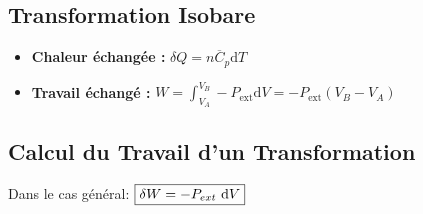 \documentclass[a4paper,12pt]{article}
\newcommand{\diff}{\mathrm{d}} %
\newcommand{\re}{\textrm}
\newcommand{\Cp}{\overline{C}_p} %
\begin{document}
\subsection{Transformation Isobare}

\begin{itemize}[label=\textbullet]
    \item \textbf{Chaleur échangée :} $\delta Q = n \Cp \diff T$
    \item \textbf{Travail échangé :} $W = \int_{V_A}^{V_B}- P_{\text{ext}} \diff V = - P_{\text{ext}}(V_B-V_A)$
\end{itemize}

\subsection{Calcul du Travail d'un Transformation}

Dans le cas général: $ \boxed{\delta W = - P_{ext}\ \re d V} $
\end{document}

